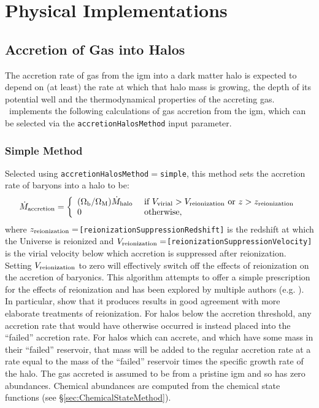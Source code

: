 \chapter{Physical Implementations}

\section{Accretion of Gas into Halos}\label{sec:AccretionBaryonic}

The accretion rate of gas from the \gls{igm} into a dark matter halo is expected to depend on (at least) the rate at which that halo mass is growing, the depth of its potential well and the thermodynamical properties of the accreting gas. \glc\ implements the following calculations of gas accretion from the \gls{igm}, which can be selected via the {\tt accretionHalosMethod} input parameter.

\subsection{Simple Method}

Selected using {\tt accretionHalosMethod}$=${\tt simple}, this method sets the accretion rate of baryons into a halo to be:
\begin{equation}
 \dot{M}_{\rm accretion} = \left\{ \begin{array}{ll} (\Omega_{\rm b}/\Omega_{\rm M}) \dot{M}_{\rm halo} & \hbox{ if } V_{\rm virial} > V_{\rm reionization} \hbox{ or } z > z_{\rm reionization} \\ 0 & \hbox{ otherwise,}\end{array} \right.
\end{equation}
where $z_{\rm reionization}=${\tt [reionizationSuppressionRedshift]} is the redshift at which the Universe is reionized and $V_{\rm reionization}=${\tt [reionizationSuppressionVelocity]} is the virial velocity below which accretion is suppressed after reionization. Setting $V_{\rm reionization}$ to zero will effectively switch off the effects of reionization on the accretion of baryonics. This algorithm attempts to offer a simple prescription for the effects of reionization and has been explored by multiple authors (e.g. \citealt{benson_effects_2002}). In particular, \cite{font_modelingmilky_2010} show that it produces results in good agreement with more elaborate treatments of reionization. For halos below the accretion threshold, any accretion rate that would have otherwise occurred is instead placed into the ``failed'' accretion rate. For halos which can accrete, and which have some mass in their ``failed'' reservoir, that mass will be added to the regular accretion rate at a rate equal to the mass of the 
``failed'' reservoir times the specific growth rate of the halo. The gas accreted is assumed to be from a pristine \gls{igm} and so has zero abundances. Chemical abundances are computed from the chemical state functions (see \S\ref{sec:ChemicalStateMethod}).

